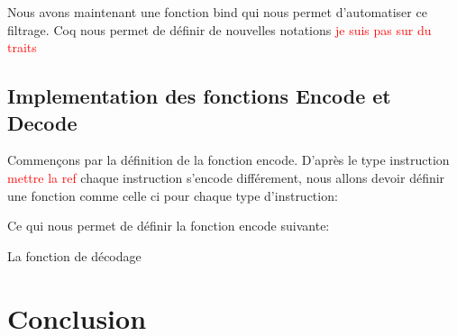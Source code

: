 \documentclass {article}
\newcommand{\codefrom}[3]
           {}
\theoremstyle{definition}
\theoremstyle{remark}
\newcommand{\todo}[1]{\textcolor{red}{#1}}
\begin{document}
\codefrom{src}{encode}{monade}

Nous avons maintenant une fonction bind qui nous permet d'automatiser ce filtrage. Coq nous permet de
définir de nouvelles notations \todo{je suis pas sur du traits}

\codefrom{src}{encode}{notation}





\subsection{Implementation des fonctions Encode et Decode}

Commençons par la définition de la fonction encode. D'après le type instruction \todo{mettre la ref}
chaque instruction s'encode différement, nous allons devoir définir une fonction comme celle ci
pour chaque type d'instruction:

\codefrom{src}{encode}{encode_t_n}

Ce qui nous permet de définir la fonction encode suivante:

\codefrom{src}{encode}{encode}

La fonction de décodage 











\section{Conclusion}
\end{document}
